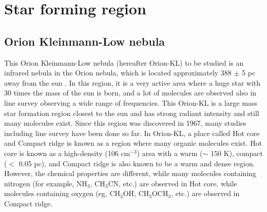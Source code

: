 
\newpage
\section{Star forming region}
\subsection{Orion Kleinmann-Low nebula}
This Orion Kleinmann-Low nebula (hereafter Orion-KL) to be studied is an infrared nebula 
in the Orion nebula, which is located approximately 388 $\pm$ 5  pc away from the sun \citep{Kounkel+2017}. 
In this region, it is a very active area where a huge star with 30 times the mass of the sun is born, and a lot of molecules are observed also in line survey observing a wide range of frequencies. 
This Orion-KL is a large mass star formation region closest to the sun and has strong radiant intensity and still many molecules exist. Since this region was discovered in 1967,  many studies including line survey have been done so far.
In Orion-KL, a place called Hot core and Compact ridge is known as a region where many organic molecules exist. Hot core is known as a high-density (106 cm$^{-3}$) area with a warm ($\sim$ 150 K), compact ($<$ 0.05 pc), and Compact ridge is also known to be a warm and dense region. 
However, the chemical properties are different, while many molecules containing nitrogen (for example, NH$_3$, CH$_3$CN, etc.) are observed in Hot core, while molecules containing oxygen (eg, CH$_3$OH, CH$_3$OCH$_3$, etc.) are observed in Compact ridge.


